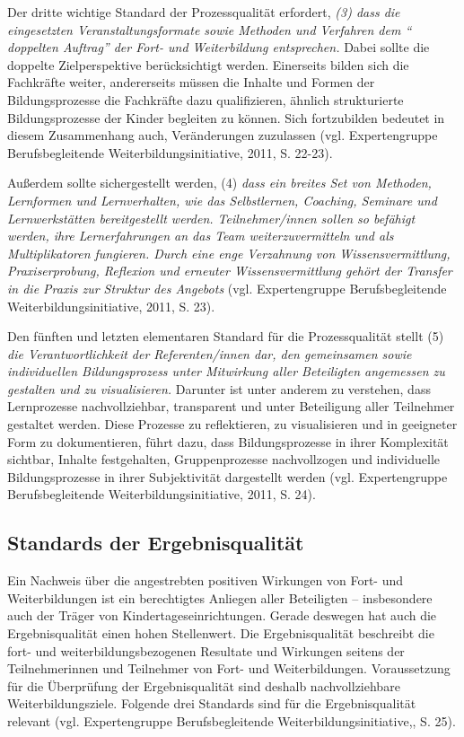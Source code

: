 \documentclass[12pt,a4paper]{article}
\begin{document}
Der dritte wichtige Standard der Prozessqualität erfordert, \textit{(3) dass die eingesetzten Veranstaltungsformate sowie Methoden und Verfahren dem "` doppelten Auftrag"' der Fort- und Weiterbildung entsprechen.} Dabei sollte die doppelte Zielperspektive berücksichtigt werden. Einerseits bilden sich die Fachkräfte weiter, andererseits müssen die Inhalte und Formen der Bildungsprozesse die Fachkräfte dazu qualifizieren, ähnlich strukturierte Bildungsprozesse der Kinder begleiten zu können. Sich fortzubilden bedeutet  in diesem Zusammenhang auch, Veränderungen zuzulassen (vgl. Expertengruppe Berufsbegleitende Weiterbildungsinitiative, 2011, S. 22-23). 

Außerdem sollte sichergestellt werden, (4) \textit{dass ein breites Set von Methoden, Lernformen und Lernverhalten, wie das Selbstlernen, Coaching, Seminare und Lernwerkstätten bereitgestellt werden. Teilnehmer/innen sollen so befähigt werden, ihre Lernerfahrungen an das Team weiterzuvermitteln und als Multiplikatoren fungieren. Durch eine enge Verzahnung von Wissensvermittlung, Praxiserprobung, Reflexion und erneuter Wissensvermittlung gehört der Transfer in die Praxis zur Struktur des Angebots} (vgl. Expertengruppe Berufsbegleitende Weiterbildungsinitiative, 2011, S. 23). 

Den fünften und letzten elementaren Standard für die Prozessqualität stellt (5)\textit{ die Verantwortlichkeit der Referenten/innen dar, den gemeinsamen sowie individuellen Bildungsprozess unter Mitwirkung aller Beteiligten angemessen zu gestalten und zu visualisieren.} Darunter ist unter anderem zu verstehen, dass Lernprozesse nachvollziehbar, transparent und unter Beteiligung aller Teilnehmer gestaltet werden. Diese Prozesse zu reflektieren, zu visualisieren und in geeigneter Form zu dokumentieren, führt dazu, dass Bildungsprozesse in ihrer Komplexität sichtbar, Inhalte festgehalten, Gruppenprozesse nachvollzogen und individuelle Bildungsprozesse in ihrer Subjektivität dargestellt werden (vgl. Expertengruppe Berufsbegleitende Weiterbildungsinitiative, 2011, S. 24). 

 \subsection{Standards der Ergebnisqualität}
 
Ein Nachweis über die angestrebten positiven Wirkungen von Fort- und Weiterbildungen ist ein berechtigtes Anliegen aller Beteiligten – insbesondere auch der Träger von Kindertageseinrichtungen. Gerade deswegen hat auch die Ergebnisqualität einen hohen Stellenwert. Die Ergebnisqualität beschreibt die fort- und weiterbildungsbezogenen Resultate und Wirkungen seitens der Teilnehmerinnen und Teilnehmer von Fort- und Weiterbildungen. Voraussetzung für die Überprüfung der Ergebnisqualität sind deshalb nachvollziehbare Weiterbildungsziele. Folgende drei Standards sind für die Ergebnisqualität relevant (vgl. Expertengruppe Berufsbegleitende Weiterbildungsinitiative,, S. 25). 
\end{document}
